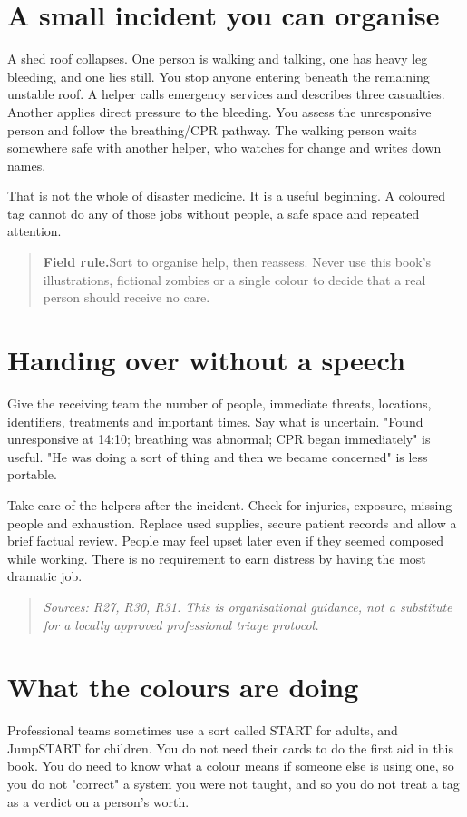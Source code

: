 \documentclass[10pt,openright]{book}
\newcommand{\fieldrule}[1]{\begin{quote}\textbf{Field rule.}\enspace #1\end{quote}}
\begin{document}
\section*{A small incident you can organise}
A shed roof collapses. One person is walking and talking, one has heavy leg bleeding, and one lies still. You stop anyone entering beneath the remaining unstable roof. A helper calls emergency services and describes three casualties. Another applies direct pressure to the bleeding. You assess the unresponsive person and follow the breathing/CPR pathway. The walking person waits somewhere safe with another helper, who watches for change and writes down names.

That is not the whole of disaster medicine. It is a useful beginning. A coloured tag cannot do any of those jobs without people, a safe space and repeated attention.

\fieldrule{Sort to organise help, then reassess. Never use this book's illustrations, fictional zombies or a single colour to decide that a real person should receive no care.}
\section*{Handing over without a speech}
Give the receiving team the number of people, immediate threats, locations, identifiers, treatments and important times. Say what is uncertain. "Found unresponsive at 14:10; breathing was abnormal; CPR began immediately" is useful. "He was doing a sort of thing and then we became concerned" is less portable.

Take care of the helpers after the incident. Check for injuries, exposure, missing people and exhaustion. Replace used supplies, secure patient records and allow a brief factual review. People may feel upset later even if they seemed composed while working. There is no requirement to earn distress by having the most dramatic job.

\begin{quote}\emph{Sources: R27, R30, R31. This is organisational guidance, not a substitute for a locally approved professional triage protocol.}\end{quote}
\section*{What the colours are doing}
Professional teams sometimes use a sort called START for adults, and JumpSTART for children. You do not need their cards to do the first aid in this book. You do need to know what a colour means if someone else is using one, so you do not "correct" a system you were not taught, and so you do not treat a tag as a verdict on a person's worth.
\end{document}
